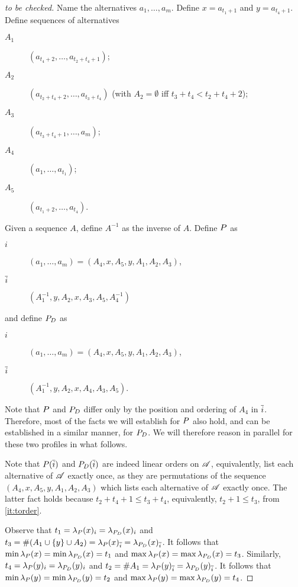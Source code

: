 \documentclass[pagesize, twoside=off, bibliography=totoc, DIV=calc, fontsize=12pt, a4paper]{scrartcl}
\begin{document}
\begin{proof}[to be checked]
	Name the alternatives $a_1, …, a_m$.
	Define $x = a_{t_1 + 1}$ and $y = a_{t_4 + 1}$.
	Define sequences of alternatives 
	\begin{description}
		\item[$A_1$] $(a_{t_4 + 2}, …, a_{t_2 + t_4 + 1})$;
		\item[$A_2$] $(a_{t_2 + t_4 + 2}, …, a_{t_3 + t_4})$ (with $A_2 = \emptyset$ iff $t_3 + t_4 < t_2 + t_4 + 2$);
		\item[$A_3$] $(a_{t_3 + t_4 + 1}, …, a_m)$;
		\item[$A_4$] $(a_1, …, a_{t_1})$;
		\item[$A_5$] $(a_{t_1 + 2}, …, a_{t_4})$.
	\end{description}
	Given a sequence $A$, define $A^{-1}$ as the inverse of $A$.
	Define $P$ as
	\begin{description}
		\item[$i$] $(a_1, …, a_m) = (A_4, x, A_5, y, A_1, A_2, A_3)$,
		\item[$\overline{i}$] $(A_1^{-1}, y, A_2, x, A_3, A_5, A_4^{-1})$
	\end{description}
	and define $P_D$ as
	\begin{description}
		\item[$i$] $(a_1, …, a_m) = (A_4, x, A_5, y, A_1, A_2, A_3)$,
		\item[$\overline{i}$] $(A_1^{-1}, y, A_2, x, A_4, A_3, A_5)$.
	\end{description}
	Note that $P$ and $P_D$ differ only by the position and ordering of $A_4$ in $\overline{i}$. Therefore, most of the facts we will establish for $P$ also hold, and can be established in a similar manner, for $P_D$.
	We will therefore reason in parallel for these two profiles in what follows.
	
	Note that $P(\overline{i})$ and $P_D(\overline{i})$ are indeed linear orders on $\mathscr{A}$, equivalently, list each alternative of $\mathscr{A}$ exactly once, as they are permutations of the sequence $(A_4, x, A_5, y, A_1, A_2, A_3)$ which lists each alternative of $\mathscr{A}$ exactly once. The latter fact holds because $t_2 + t_4 + 1 ≤ t_3 + t_4$, equivalently, $t_2 + 1 ≤ t_3$, from \cref{it:torder}.
	
	Observe that $t_1 = \lambda_P(x)_i = \lambda_{P_D}(x)_i$ and $t_3 = \# (A_1 \cup \{y\} \cup A_2) = \lambda_P(x)_{\overline{i}} = \lambda_{P_D}(x)_{\overline{i}}$. It follows that $\min \lambda_P(x) = \min \lambda_{P_D}(x) = t_1$ and $\max \lambda_P(x) = \max \lambda_{P_D}(x) = t_3$.
	Similarly, $t_4 = \lambda_P(y)_i = \lambda_{P_D}(y)_i$ and $t_2 = \# A_1 = \lambda_P(y)_{\overline{i}} = \lambda_{P_D}(y)_{\overline{i}}$. It follows that $\min \lambda_P(y) = \min \lambda_{P_D}(y) = t_2$ and $\max \lambda_P(y) = \max \lambda_{P_D}(y) = t_4$.


\end{proof}
\end{document}
